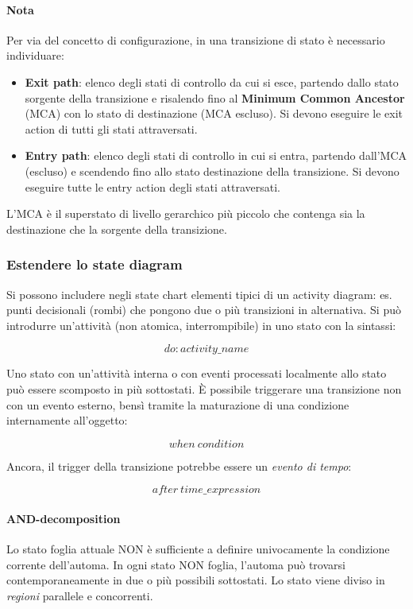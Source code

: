 \newpage

\paragraph{Nota} Per via del concetto di configurazione, in una transizione di stato è necessario individuare:

\begin{itemize}
    \item \textbf{Exit path}: elenco degli stati di controllo da cui si esce, partendo dallo stato sorgente della transizione e risalendo fino al \textbf{Minimum Common Ancestor} (MCA) con lo stato di destinazione (MCA escluso). Si devono eseguire le exit action di tutti gli stati attraversati.
    \item \textbf{Entry path}: elenco degli stati di controllo in cui si entra, partendo dall'MCA (escluso) e scendendo fino allo stato destinazione della transizione. Si devono eseguire tutte le entry action degli stati attraversati.
\end{itemize}

L'MCA è il superstato di livello gerarchico più piccolo che contenga sia la destinazione che la sorgente della transizione.

\subsubsection{Estendere lo state diagram}

Si possono includere negli state chart elementi tipici di un activity diagram: es. punti decisionali (rombi) che pongono due o più transizioni in alternativa. Si può introdurre un'attività (non atomica, interrompibile) in uno stato con la sintassi:

$$do:activity\_name$$

Uno stato con un'attività interna o con eventi processati localmente allo stato può essere scomposto in più sottostati. È possibile triggerare una transizione non con un evento esterno, bensì tramite la maturazione di una condizione internamente all'oggetto:

$$when\ condition$$

Ancora, il trigger della transizione potrebbe essere un \textit{evento di tempo}:

$$after\ time\_expression$$

\newpage

\paragraph{AND-decomposition} Lo stato foglia attuale NON è sufficiente a definire univocamente la condizione corrente dell'automa. In ogni stato NON foglia, l'automa può trovarsi contemporaneamente in due o più possibili sottostati. Lo stato viene diviso in \textit{regioni} parallele e concorrenti.

